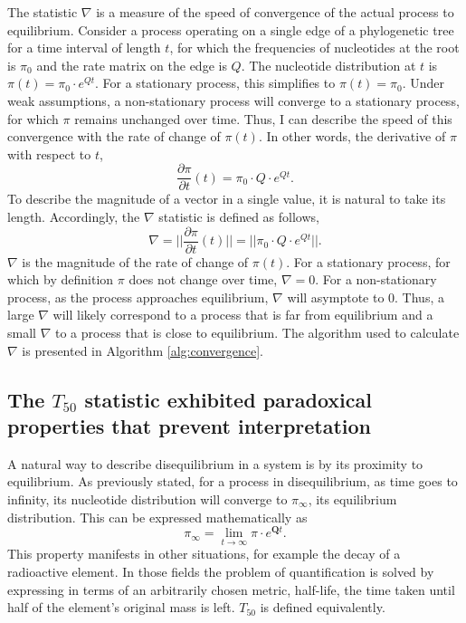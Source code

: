 The statistic $\nabla$ is a measure of the speed of convergence of the actual process to equilibrium. Consider a process operating on a single edge of a phylogenetic tree for a time interval of length $t$, for which the frequencies of nucleotides at the root is $\pi_0$ and the rate matrix on the edge is $Q$. The nucleotide distribution at $t$ is $\pi(t) = \pi_{0} \cdot e^{Qt}$. For a stationary process, this simplifies to $\pi(t) = \pi_{0}$. Under weak assumptions, a non-stationary process will converge to a stationary process, for which $\pi$ remains unchanged over time. Thus, I can describe the speed of this convergence with the rate of change of $\pi(t)$. In other words, the derivative of $\pi$ with respect to $t$,
\begin{equation}
\label{eq:dpi/dt}
\frac{\partial \pi}{\partial t}(t) = \pi_{0} \cdot Q \cdot e^{Qt}.
\end{equation}
To describe the magnitude of a vector in a single value, it is natural to take its length. Accordingly, the $\nabla$ statistic is defined as follows,
\begin{equation}
\label{eq:len-dpi/dt}
\nabla = ||\frac{\partial \pi}{\partial t}(t)|| =|| \pi_{0} \cdot Q \cdot e^{Qt}||.
\end{equation}
$\nabla$ is the magnitude of the rate of change of $\pi(t)$. For a stationary process, for which by definition $\pi$ does not change over time, $\nabla = 0$. For a non-stationary process, as the process approaches equilibrium, $\nabla$ will asymptote to $0$. Thus, a large $\nabla$ will likely correspond to a process that is far from equilibrium and a small $\nabla$ to a process that is close to equilibrium. The algorithm used to calculate $\nabla$ is presented in Algorithm \ref{alg:convergence}.








\subsection*{The $T_{50}$ statistic exhibited paradoxical properties that prevent interpretation}

A natural way to describe disequilibrium in a system is by its proximity to equilibrium. As previously stated, for a process in disequilibrium, as time goes to infinity, its nucleotide distribution will converge to $\pi_\infty$, its equilibrium distribution. This can be expressed mathematically as 
$$\pi_\infty = \lim_{t \to \infty}\pi \cdot e^{\mathbf{Q}t}.$$ 
This property manifests in other situations, for example the decay of a radioactive element. In those fields the problem of quantification is solved by expressing in terms of an arbitrarily chosen metric, half-life, the time taken until half of the element's original mass is left. ${T_{50}}$ is defined equivalently.

